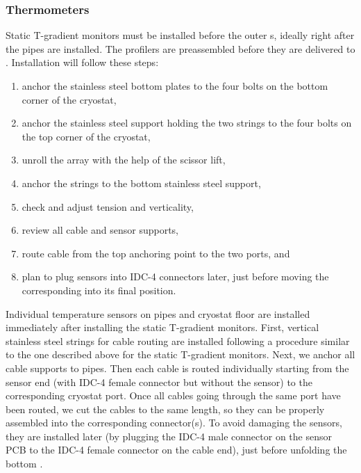 \subsubsection{Thermometers}
\label{sec:fdgen-slow-cryo-install-th}

Static T-gradient monitors %
must be installed before the outer s, ideally %
right after the pipes are installed. The profilers %
are preassembled before they are delivered to \surf. 
Installation will follow these steps:
\begin{enumerate}
\item anchor the stainless steel bottom plates to the four bolts on the bottom corner of the cryostat,
\item anchor the stainless steel support holding the two strings to the four bolts on the top corner of the cryostat,
\item unroll the array with the help of the scissor lift,
\item anchor the strings to the bottom stainless steel support,   
\item check and adjust tension and verticality,
\item review all cable and sensor supports, 
\item route cable from the top anchoring point to the two  ports, and 
\item plan to plug sensors into IDC-4 connectors later, just before moving the corresponding  into its final position. 
\end{enumerate}

Individual temperature sensors on pipes and cryostat floor %
are installed immediately after installing the static T-gradient monitors. First, vertical stainless steel strings for cable routing %
are installed following a procedure similar to the one described above for the static T-gradient monitors. Next, we anchor all cable supports to pipes. Then each cable %
is routed individually starting from the sensor end (with IDC-4 female connector but without the sensor)
to the corresponding cryostat port. Once all cables going through the same port have been routed, we cut the cables to the same length, so they can be properly assembled into the corresponding connector(s). To avoid damaging the sensors, they are installed later (by plugging the IDC-4 male connector on the sensor PCB to the IDC-4 female connector on the cable end), just before unfolding the bottom .

